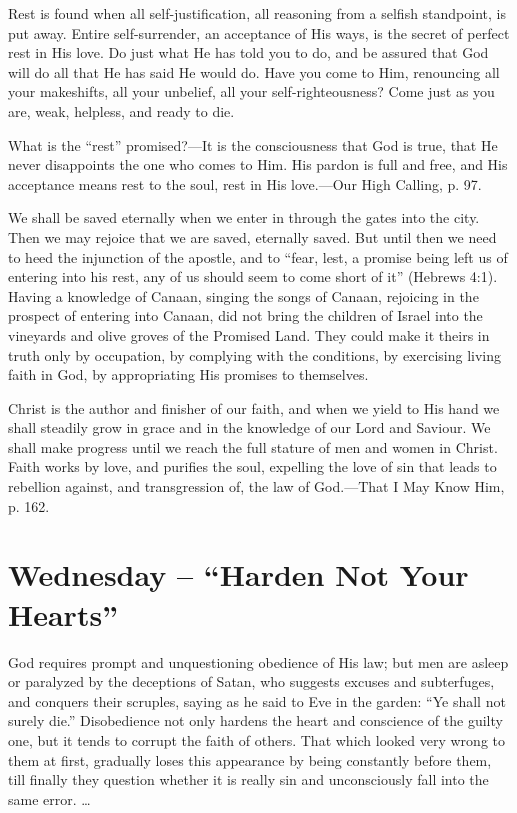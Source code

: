 \documentclass[a4paper, 10pt, twoside, headings=small]{scrartcl}
\begin{document}
\begin{multicols}{2}
Rest is found when all self-justification, all reasoning from a selfish standpoint, is put away. Entire self-surrender, an acceptance of His ways, is the secret of perfect rest in His love. Do just what He has told you to do, and be assured that God will do all that He has said He would do. Have you come to Him, renouncing all your makeshifts, all your unbelief, all your self-righteousness? Come just as you are, weak, helpless, and ready to die.

What is the “rest” promised?—It is the consciousness that God is true, that He never disappoints the one who comes to Him. His pardon is full and free, and His acceptance means rest to the soul, rest in His love.—Our High Calling, p. 97.

We shall be saved eternally when we enter in through the gates into the city. Then we may rejoice that we are saved, eternally saved. But until then we need to heed the injunction of the apostle, and to “fear, lest, a promise being left us of entering into his rest, any of us should seem to come short of it” (Hebrews 4:1). Having a knowledge of Canaan, singing the songs of Canaan, rejoicing in the prospect of entering into Canaan, did not bring the children of Israel into the vineyards and olive groves of the Promised Land. They could make it theirs in truth only by occupation, by complying with the conditions, by exercising living faith in God, by appropriating His promises to themselves.

Christ is the author and finisher of our faith, and when we yield to His hand we shall steadily grow in grace and in the knowledge of our Lord and Saviour. We shall make progress until we reach the full stature of men and women in Christ. Faith works by love, and purifies the soul, expelling the love of sin that leads to rebellion against, and transgression of, the law of God.—That I May Know Him, p. 162.

\section*{Wednesday – “Harden Not Your Hearts”}

God requires prompt and unquestioning obedience of His law; but men are asleep or paralyzed by the deceptions of Satan, who suggests excuses and subterfuges, and conquers their scruples, saying as he said to Eve in the garden: “Ye shall not surely die.” Disobedience not only hardens the heart and conscience of the guilty one, but it tends to corrupt the faith of others. That which looked very wrong to them at first, gradually loses this appearance by being constantly before them, till finally they question whether it is really sin and unconsciously fall into the same error. …


\end{multicols}
\end{document}
